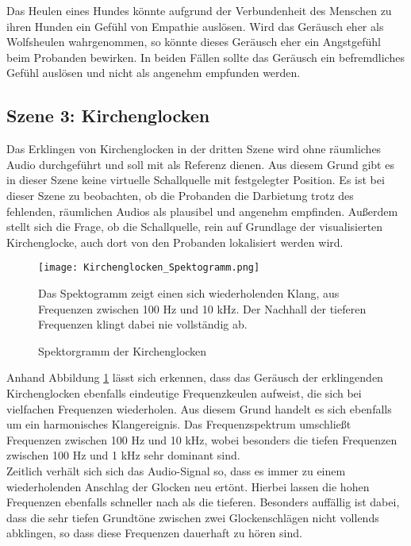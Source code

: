 Das Heulen eines Hundes könnte aufgrund der Verbundenheit des Menschen zu ihren Hunden ein Gefühl von Empathie auslösen. Wird das Geräusch eher als Wolfsheulen wahrgenommen, so könnte dieses Geräusch eher ein Angstgefühl beim Probanden bewirken. In beiden Fällen sollte das Geräusch ein befremdliches Gefühl auslösen und nicht als angenehm empfunden werden. 

\newpage
\subsection{Szene 3: Kirchenglocken}
Das Erklingen von Kirchenglocken in der dritten Szene wird ohne räumliches Audio durchgeführt und soll mit als Referenz dienen. Aus diesem Grund gibt es in dieser Szene keine virtuelle Schallquelle mit festgelegter Position. Es ist bei dieser Szene zu beobachten, ob die Probanden die Darbietung trotz des fehlenden, räumlichen Audios als plausibel und angenehm empfinden. Außerdem stellt sich die Frage, ob die Schallquelle, rein auf Grundlage der visualisierten Kirchenglocke, auch dort von den Probanden lokalisiert werden wird.
 
    \begin{figure}[H]
\centering
\texttt{[image: Kirchenglocken\_Spektogramm.png]}
\caption{Spektorgramm der Kirchenglocken}
Das Spektogramm zeigt einen sich wiederholenden Klang, aus Frequenzen zwischen 100 Hz und 10 kHz. Der Nachhall der tieferen Frequenzen klingt dabei nie vollständig ab. 
\label{fig:Kirchenglocken_Spektogramm}
\end{figure} 

Anhand Abbildung \ref{fig:Kirchenglocken_Spektogramm} lässt sich erkennen, dass das Geräusch der erklingenden Kirchenglocken ebenfalls eindeutige Frequenzkeulen aufweist, die sich bei vielfachen Frequenzen wiederholen. Aus diesem Grund handelt es sich ebenfalls um ein harmonisches Klangereignis. Das Frequenzspektrum umschließt Frequenzen zwischen 100 Hz und 10 kHz, wobei besonders die tiefen Frequenzen zwischen 100 Hz und 1 kHz sehr dominant sind. \\

Zeitlich verhält sich sich das Audio-Signal so, dass es immer zu einem  wiederholenden Anschlag der Glocken neu ertönt. Hierbei lassen die hohen  Frequenzen ebenfalls schneller nach als die tieferen. Besonders auffällig ist dabei, dass die sehr tiefen Grundtöne zwischen zwei Glockenschlägen nicht vollends abklingen, so dass diese Frequenzen dauerhaft zu hören sind.  \\

